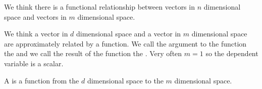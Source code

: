 

We think there
is a functional
relationship
between vectors in $n$
dimensional space and vectors
in $m$ dimensional space.


We think a vector in
$d$ dimensional space
and a vector in $m$ dimensional
space are approximately related
by a function.
We call the argument to the
function the 
and we call the result
of the function the .
Very often $m = 1$ so the dependent
variable is a scalar.

A  is a function
from the $d$ dimensional space
to the $m$ dimensional space.
